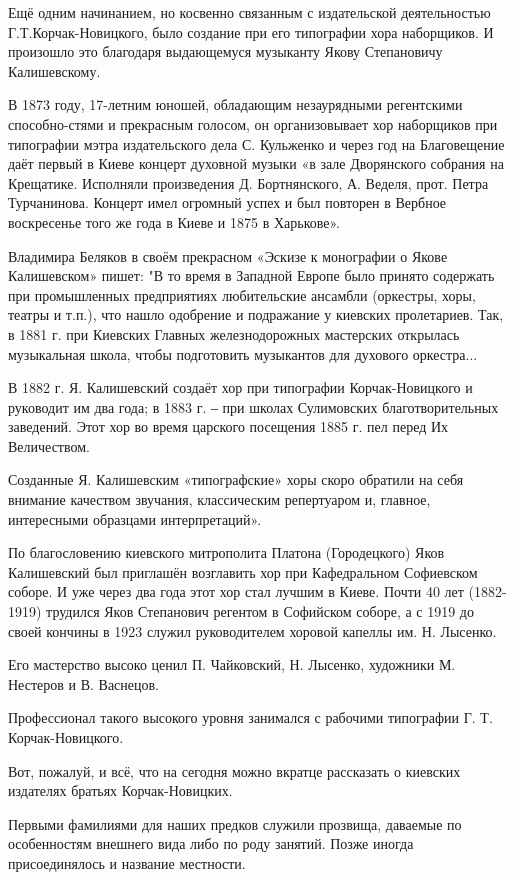 Ещё одним начинанием, но косвенно связанным с издательской деятельностью
Г.Т.Корчак-Новицкого, было создание при его типографии хора наборщиков. И
произошло это благодаря выдающемуся музыканту Якову Степановичу Калишевскому. 

В 1873 году, 17-летним юношей, обладающим незаурядными регентскими
способно-стями и прекрасным голосом, он организовывает хор наборщиков при
типографии мэтра издательского дела С. Кульженко и через год на Благовещение
даёт первый в Киеве концерт духовной музыки «в зале Дворянского собрания на
Крещатике. Исполняли произведения Д. Бортнянского, А. Веделя, прот. Петра
Турчанинова. Концерт имел огромный успех и был повторен в Вербное воскресенье
того же года в Киеве и 1875 в Харькове».

Владимира Беляков  в своём прекрасном «Эскизе к монографии о Якове Калишевском»
пишет: "В то время в Западной Европе было принято содержать при промышленных
предприятиях любительские ансамбли (оркестры, хоры, театры и т.п.), что нашло
одобрение и подражание у киевских пролетариев. Так, в 1881 г. при Киевских
Главных железнодорожных мастерских открылась музыкальная школа, чтобы
подготовить музыкантов для духового оркестра...

В 1882 г. Я. Калишевский создаёт хор при типографии Корчак-Новицкого и
руководит им два года; в 1883 г. ‒ при школах Сулимовских благотворительных
заведений. Этот хор во время царского посещения 1885 г. пел перед Их
Величеством.

Созданные Я. Калишевским «типографские» хоры скоро обратили на себя внимание
качеством звучания, классическим репертуаром и, главное, интересными образцами
интерпретаций». 

По благословению киевского митрополита Платона (Городецкого) Яков Калишевский
был приглашён возглавить хор при Кафедральном Софиевском соборе. И уже через
два года этот хор стал лучшим в Киеве. Почти 40 лет (1882-1919) трудился Яков
Степанович регентом в Софийском соборе, а с 1919 до своей кончины в 1923 служил
руководителем хоровой капеллы им. Н. Лысенко.

Его мастерство высоко ценил П. Чайковский, Н. Лысенко, художники М. Нестеров и
В. Васнецов. 

Профессионал такого высокого уровня занимался с рабочими типографии
Г. Т. Корчак-Новицкого.

Вот, пожалуй, и всё, что на сегодня можно вкратце рассказать о киевских
издателях братьях Корчак-Новицких.

Первыми фамилиями для наших предков служили прозвища, даваемые по особенностям
внешнего вида либо по роду занятий. Позже иногда присоединялось и название
местности.

